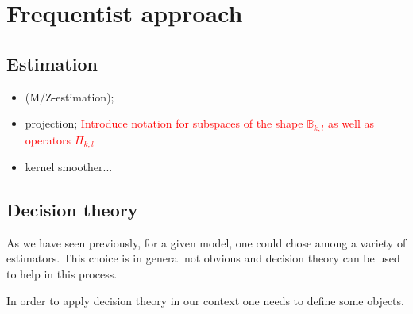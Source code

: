 \section{Frequentist approach}\label{INTRO_FREQ}

\subsection{Estimation}\label{INTRO_FREQ_ESTIMATION}
\begin{itemize}
\item (M/Z-estimation);
\item projection; \textcolor{red}{Introduce notation for subspaces of the shape $\mathds{B}_{k,l}$ as well as operators $\Pi_{k,l}$}
\item kernel smoother...
\end{itemize}

\subsection{Decision theory}\label{INTRO_FREQ_DECISION}

As we have seen previously, for a given model, one could chose among a variety of estimators.
This choice is in general not obvious and decision theory can be used to help in this process.

\medskip

In order to apply decision theory in our context one needs to define some objects.


